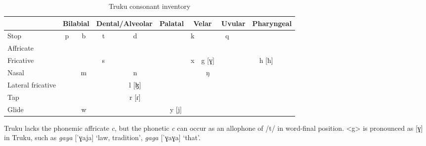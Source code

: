 \documentclass[12pt]{article}
\begin{document}
\begin{table}[!htbp]
\centering
\caption{Truku consonant inventory}
\label{tab:trC}
\begin{tabular}{l|cc|cc|cc|cc|cc|cc}
\hline
                    & \multicolumn{2}{c|}{Bilabial} & \multicolumn{2}{c|}{Dental/Alveolar} & \multicolumn{2}{c|}{Palatal} & \multicolumn{2}{c|}{Velar} & \multicolumn{2}{c|}{Uvular} & \multicolumn{2}{c}{Pharyngeal} \\ \hline
Stop                & p            & b           & t               & d               &             &               & k          &            & q            &            &                 &              \\
Affricate           &               &              &                &                  &             &               &             &             &               &            &                 &              \\
Fricative           &               &              & s               &                  &             &               & x          &   g [ɣ]          &               &            & h [ħ]             &              \\
Nasal               &               & m           &                  & n               &             &               &             & ŋ          &               &            &                 &              \\
Lateral fricative &               &              &                  & l [ɮ]              &             &               &             &             &               &            &                 &              \\
Tap                 &               &              &                  & r [ɾ]              &             &               &             &             &               &            &                 &              \\
Glide               &               & w           &                  &                  &             & y [j]           &             &             &               &            &                 &              \\ \hline
\end{tabular}
\end{table}

Truku lacks the phonemic affricate \textit{c}, but the phonetic \textit{c} can occur as an allophone of /t/ in word-final position. <g> is pronounced as [ɣ] in Truku, such as \textit{gaya} [ˈɣaja] `law, tradition', \textit{gaga} [ˈɣaɣa] `that'.
\end{document}
